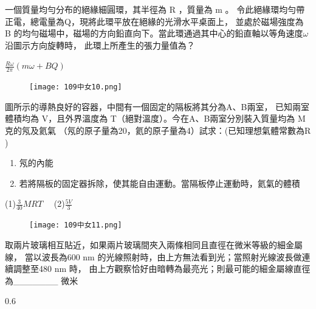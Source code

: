 \documentclass[cn,10pt,math=newtx,chinesefont=founder,device=ig]{elegantbook}
\begin{document}
\begin{example}
  一個質量均勻分布的絕緣細圓環，其半徑為 R ，質量為 m 。
  令此絕緣環均勻帶正電，總電量為Q，現將此環平放在絕緣的光滑水平桌面上，
  並處於磁場強度為 B 的均勻磁場中，磁場的方向鉛直向下。當此環通過其中心的鉛直軸以等角速度$\omega$沿圖示方向旋轉時，
  此環上所產生的張力量值為？\\
  \rightline{[台中女中教甄109]} 
\end{example}
\begin{solution}
  $\frac{R\omega}{2\pi}(m\omega+BQ)$
\end{solution}
\begin{figure}[htbp]
  \flushright
  \texttt{[image: 109中女10.png]}
\end{figure}
\newpage
\begin{example}
  圖所示的導熱良好的容器，中間有一個固定的隔板將其分為A、B兩室，
  已知兩室體積均為 V，且外界溫度為 T（絕對溫度）。今在A、B兩室分別裝入質量均為 M 克的氖及氦氣
 （氖的原子量為20，氦的原子量為4）試求：(已知理想氣體常數為R ) 
  \begin{enumerate}
    \item 氖的內能
    \item 若將隔板的固定器拆除，使其能自由運動。當隔板停止運動時，氦氣的體積
  \end{enumerate}
  
  \rightline{[台中女中教甄109]} 
\end{example}
\begin{solution}
  (1)$\frac{3}{40}MRT$ \ \ (2)$\frac{5V}{3}$
\end{solution}
\begin{figure}[htbp]
  \flushright
  \texttt{[image: 109中女11.png]}
\end{figure}
\newpage

\begin{example}
  取兩片玻璃相互貼近，如果兩片玻璃間夾入兩條相同且直徑在微米等級的細金屬線，
  當以波長為600 nm 的光線照射時，由上方無法看到光；當照射光線波長做連續調整至480 nm 時，
  由上方觀察恰好由暗轉為最亮光；則最可能的細金屬線直徑為\_\_\_\_\_\_\_ 微米\\
  \rightline{[台中女中教甄109]} 
\end{example}
\begin{solution}
  0.6
\end{solution}
\newpage
\end{document}
